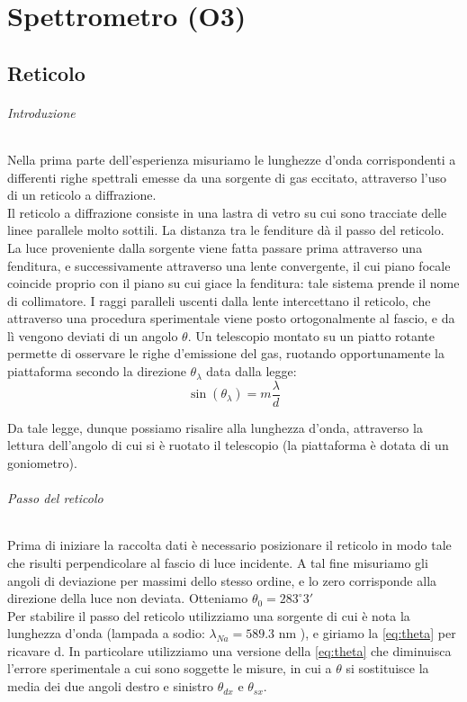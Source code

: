 \chapter{Spettrometro (O3)}


\section*{Reticolo}

\subparagraph{Introduzione}

Nella prima parte dell'esperienza misuriamo le lunghezze d'onda corrispondenti a differenti righe spettrali emesse da una sorgente di gas eccitato, attraverso l'uso di un reticolo a diffrazione. \\
Il reticolo a diffrazione consiste in una lastra di vetro su cui sono tracciate delle linee parallele molto sottili. La distanza tra le fenditure dà il passo del reticolo.\\
La luce proveniente dalla sorgente viene fatta passare prima attraverso una fenditura, e successivamente attraverso una lente convergente, il cui piano focale coincide proprio con il piano su cui giace la fenditura: tale sistema prende il nome di collimatore. I raggi paralleli uscenti dalla lente intercettano il reticolo, che attraverso una procedura sperimentale viene posto ortogonalmente al fascio, e da lì vengono deviati di un angolo $\theta$. Un telescopio montato su un piatto rotante permette di osservare le righe d'emissione del gas, ruotando opportunamente la piattaforma secondo la direzione $\theta_{\lambda} $ data dalla legge:
\begin{equation}
\sin (\theta_{\lambda} )= m \frac{\lambda}{d}
\label{eq:theta}
\end{equation}


Da tale legge, dunque possiamo risalire alla lunghezza d'onda, attraverso la lettura dell'angolo di cui si è ruotato il telescopio (la piattaforma è dotata di un goniometro).

\subparagraph{Passo del reticolo}

Prima di iniziare la raccolta dati è necessario posizionare il reticolo in modo tale che risulti perpendicolare al fascio di luce incidente. A tal fine misuriamo gli angoli di deviazione per massimi dello stesso ordine, e lo zero corrisponde alla direzione della luce non deviata. Otteniamo $\theta_{0} = 283^\circ 3' $ \\
Per stabilire il passo del reticolo utilizziamo una sorgente di cui è nota la lunghezza d'onda (lampada a sodio: $\lambda_{Na} = 589.3 $ nm ), e giriamo la \ref{eq:theta} per ricavare d. In particolare utilizziamo una versione della \ref{eq:theta} che diminuisca l'errore sperimentale a cui sono soggette le misure, in cui a $\theta$ si sostituisce la media dei due angoli destro e sinistro $\theta_{dx} $ e $\theta_{sx}$.

